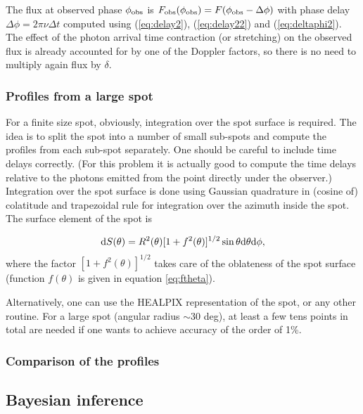 \documentclass{wihuri}
\def\be{\begin{equation}}
\def\ee{\end{equation}}
\def\d{{\rm d}}
\def\phiobs{\phi_{\rm obs}}
\begin{document}
The flux at observed phase $\phiobs$ is
${F}_{\rm obs}(\phiobs)=F(\phiobs-\Delta\phi)$ with
phase delay  $\Delta \phi=2\pi\nu\Delta t$
computed using (\ref{eq:delay2}), (\ref{eq:delay22}) and (\ref{eq:deltaphi2}).
The effect of the photon arrival time contraction (or stretching) on
the observed flux is already accounted for by one of the Doppler factors, 
so there is no need to multiply again flux by $\delta$.



\subsubsection{Profiles from a large spot} 

For a finite size spot, obviously, integration over the spot surface is required. 
The idea is to split the spot into a number of small sub-spots and compute the profiles 
from each sub-spot separately. One should be careful to include time delays correctly. 
(For this problem it is actually good to compute the time delays relative to the 
photons emitted from the point directly under the observer.) 
Integration over the spot surface is done using Gaussian quadrature in (cosine of) colatitude and trapezoidal rule for integration over the azimuth inside the spot. The surface element of the spot is 


\be \label{eq:surf_element}
\d S(\theta) = R^{2}(\theta) [1+f^{2}(\theta)]^{1/2} \sin \theta \d \theta \d \phi ,
\ee
where the factor $[1+f^{2}(\theta)]^{1/2}$ takes care of the oblateness of the spot surface (function $f(\theta)$ is given in equation \ref{eq:ftheta}).


Alternatively, one can use the HEALPIX representation of the spot, or any other routine. 
For a large spot (angular radius $\sim$30 deg), 
at least a few tens points in total are needed if one wants to achieve accuracy of the order of 1\%. 


\subsubsection{Comparison of the profiles}



\subsection{Bayesian inference}
\end{document}

